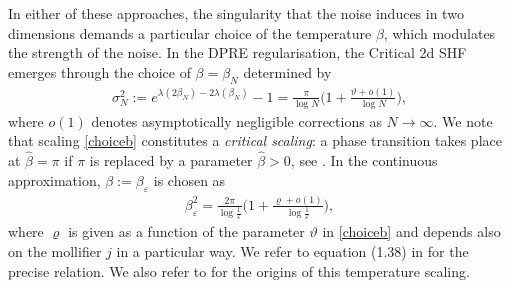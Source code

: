 \documentclass[a4paper,reqno,11pt]{amsart}
\numberwithin{equation}{section}
\theoremstyle{mytheorem}
\renewcommand{\epsilon}{\varepsilon}
\renewcommand{\theta}{\vartheta}
\renewcommand{\rho}{\varrho}
\begin{document}
In either of these approaches, the singularity that the noise induces in two dimensions demands a particular choice
of the temperature $\beta$, which modulates the strength of the noise. In the DPRE regularisation, the 
Critical 2d SHF emerges through the choice of $\beta=\beta_N$ determined by
\begin{align}\label{choiceb}
\sigma_N^2:= e^{\lambda(2\beta_N)-2\lambda(\beta_N)}-1 = \frac{\pi}{\log N} \Big(1+\frac{\theta+o(1)}{\log N} \Big),
\end{align}
where $o(1)$ denotes asymptotically negligible corrections as $N\to \infty$. 
We note that scaling \eqref{choiceb} constitutes a {\it critical scaling}: a phase transition takes place at $\hat\beta=\pi$ if $\pi$ is replaced
by a parameter $\hat\beta >0$, see \cite{CSZ17}.
In the continuous approximation,
 $\beta:=\beta_\epsilon$ is
chosen as
\begin{align}\label{beta}
\beta^2_\epsilon=\frac{2\pi}{\log\tfrac{1}{\epsilon}}\Big( 1+\frac{\rho+o(1)}{\log\tfrac{1}{\epsilon}} \Big),
\end{align}
where $\rho$ is given as a function of the parameter $\theta$ in \eqref{choiceb}
and depends also  on the mollifier $j$ in a particular way. We refer to 
equation (1.38) in \cite{CSZ19b} for the precise relation.  
We also refer to \cite{BC98} for the origins of this temperature scaling.
\end{document}
